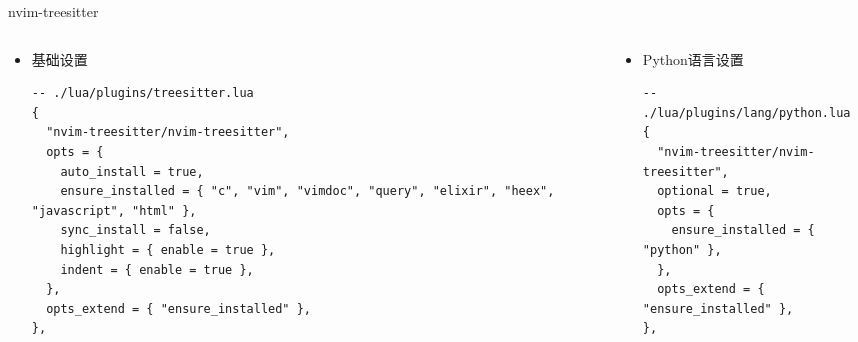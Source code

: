 \documentclass[aspectratio=169]{ctexbeamer}
\begin{document}
\begin{frame}[fragile]{nvim-treesitter}
  \begin{columns}
    \begin{column}[t]{0.5\linewidth}
      \begin{itemize}
        \item 基础设置
          \begin{lstlisting}[basicstyle=\tiny\ttfamily]
-- ./lua/plugins/treesitter.lua
{
  "nvim-treesitter/nvim-treesitter",
  opts = {
    auto_install = true,
    ensure_installed = { "c", "vim", "vimdoc", "query", "elixir", "heex", "javascript", "html" },
    sync_install = false,
    highlight = { enable = true },
    indent = { enable = true },
  },
  opts_extend = { "ensure_installed" },
},
          \end{lstlisting}
      \end{itemize}
    \end{column}

    \begin{column}[t]{0.5\linewidth}
      \begin{itemize}
        \item Python语言设置
          \begin{lstlisting}[basicstyle=\tiny\ttfamily]
-- ./lua/plugins/lang/python.lua
{
  "nvim-treesitter/nvim-treesitter",
  optional = true,
  opts = {
    ensure_installed = { "python" },
  },
  opts_extend = { "ensure_installed" },
},
          \end{lstlisting}
      \end{itemize}
    \end{column}
  \end{columns}
\end{frame}
\end{document}
